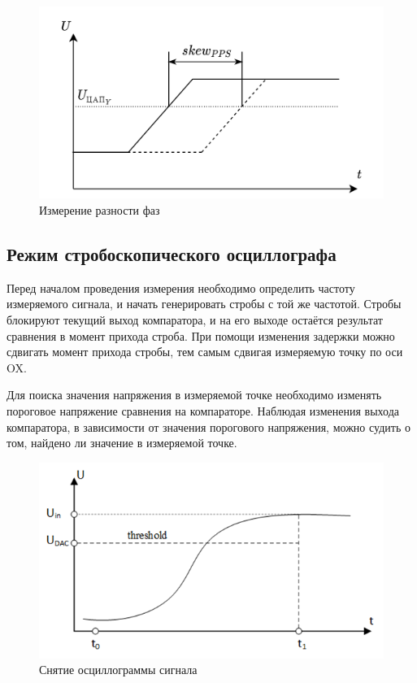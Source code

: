 \FloatBarrier

\begin{figure}[ht!] 
	\center
	\includegraphics [scale=0.4] {my_folder/images//measure_skew}
	\caption{Измерение разности фаз} 
	\label{fig:meas-skew}  
\end{figure}
 
\FloatBarrier

\subsection{Режим стробоскопического осциллографа}

Перед началом проведения измерения необходимо определить частоту измеряемого сигнала, и начать генерировать стробы с той же частотой.
Стробы блокируют текущий выход компаратора, и на его выходе остаётся результат сравнения в момент прихода строба.
При помощи изменения задержки можно сдвигать момент прихода стробы, тем самым сдвигая измеряемую точку по оси OX.

Для поиска значения напряжения в измеряемой точке необходимо изменять пороговое напряжение сравнения на компараторе. 
Наблюдая изменения выхода компаратора, в зависимости от значения порогового напряжения, можно судить о том, найдено ли значение
в измеряемой точке.

\begin{figure}[ht!] 
	\center
	\includegraphics {my_folder/images//meas_alg}
	\caption{Снятие осциллограммы сигнала} 
	\label{fig:meas-alg}  
\end{figure}


